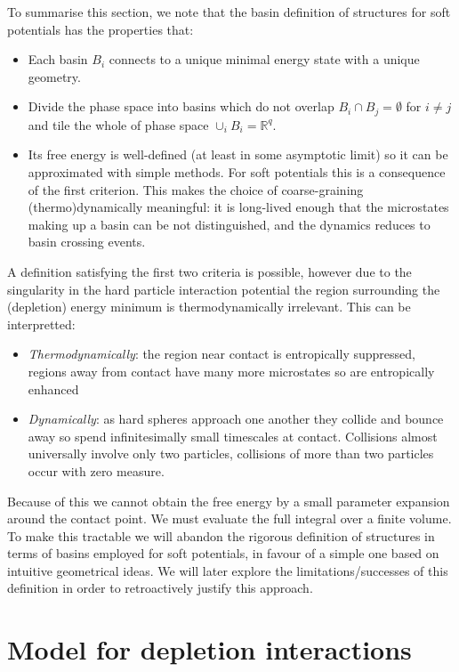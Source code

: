 \documentclass[11pt,twoside]{report}
\begin{document}
To summarise this section, we note that the basin definition of structures for soft potentials has the properties that: \cite{Wales?}
\begin{itemize}
\item Each basin $B_i$ connects to a unique minimal energy state with a unique geometry.
\item Divide the phase space into basins which do not overlap $B_i \cap B_j = \emptyset$ for $i \ne j$ and tile the whole of phase space $\cup_i B_i = \mathbb{R}^q$.
\item Its free energy is well-defined (at least in some asymptotic limit) so it can be approximated with simple methods.
  For soft potentials this is a consequence of the first criterion.
  This makes the choice of coarse-graining (thermo)dynamically meaningful: it is long-lived enough that the microstates making up a basin can be not distinguished, and the dynamics reduces to basin crossing events.
\end{itemize}
A definition satisfying the first two criteria is possible, however due to the singularity in the hard particle interaction potential the region surrounding the (depletion) energy minimum is thermodynamically irrelevant.
This can be interpretted:
\begin{itemize}
\item \emph{Thermodynamically}: the region near contact is entropically suppressed, regions away from contact have many more microstates so are entropically enhanced
\item \emph{Dynamically}: as hard spheres approach one another they collide and bounce away so spend infinitesimally small timescales at contact.
  Collisions almost universally involve only two particles, collisions of more than two particles occur with zero measure.
\end{itemize}
Because of this we cannot obtain the free energy by a small parameter expansion around the contact point.
We must evaluate the full integral over a finite volume.
To make this tractable we will abandon the rigorous definition of structures in terms of basins employed for soft potentials, in favour of a simple one based on intuitive geometrical ideas.
We will later explore the limitations/successes of this definition in order to retroactively justify this approach.

\section{Model for depletion interactions}
\end{document}

